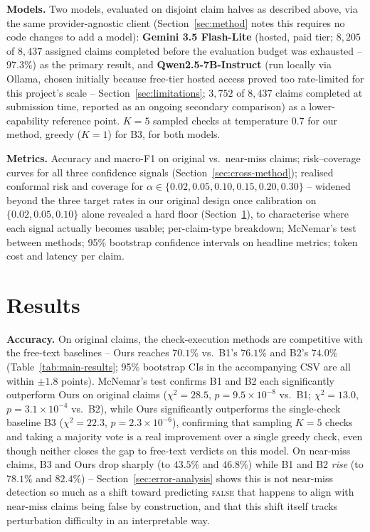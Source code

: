 \documentclass[journal]{IEEEtran}
\begin{document}
\textbf{Models.} Two models, evaluated on disjoint claim halves as described
above, via the same provider-agnostic client (Section~\ref{sec:method}
notes this requires no code changes to add a model): \textbf{Gemini 3.5
Flash-Lite} (hosted, paid tier; $8{,}205$ of $8{,}437$ assigned claims
completed before the evaluation budget was exhausted -- $97.3\%$) as the
primary result, and \textbf{Qwen2.5-7B-Instruct} (run locally via Ollama,
chosen initially because free-tier hosted access proved too rate-limited for
this project's scale -- Section~\ref{sec:limitations}; $3{,}752$ of $8{,}437$
claims completed at submission time, reported as an ongoing secondary
comparison) as a lower-capability reference point. $K=5$ sampled checks at
temperature $0.7$ for our method, greedy ($K=1$) for B3, for both models.

\textbf{Metrics.} Accuracy and macro-F1 on original vs.\ near-miss claims;
risk--coverage curves for all three confidence signals
(Section~\ref{sec:cross-method}); realised conformal risk and coverage for
$\alpha\in\{0.02,0.05,0.10,0.15,0.20,0.30\}$ -- widened beyond the three
target rates in our original design once calibration on $\{0.02,0.05,0.10\}$
alone revealed a hard floor (Section~\ref{sec:results}), to characterise
where each signal actually becomes usable; per-claim-type breakdown;
McNemar's test between methods; 95\% bootstrap confidence intervals on
headline metrics; token cost and latency per claim.

\section{Results}
\label{sec:results}



\textbf{Accuracy.} On original claims, the check-execution methods are
competitive with the free-text baselines -- Ours reaches $70.1\%$ vs.\
B1's $76.1\%$ and B2's $74.0\%$ (Table~\ref{tab:main-results}; 95\%
bootstrap CIs in the accompanying CSV are all within $\pm 1.8$ points).
McNemar's test confirms B1 and B2 each significantly outperform Ours on
original claims ($\chi^2=28.5$, $p=9.5\times10^{-8}$ vs.\ B1;
$\chi^2=13.0$, $p=3.1\times10^{-4}$ vs.\ B2), while Ours significantly
outperforms the single-check baseline B3 ($\chi^2=22.3$,
$p=2.3\times10^{-6}$), confirming that sampling $K=5$ checks and taking a
majority vote is a real improvement over a single greedy check, even though
neither closes the gap to free-text verdicts on this model. On near-miss
claims, B3 and Ours drop sharply (to $43.5\%$ and $46.8\%$) while B1 and B2
\emph{rise} (to $78.1\%$ and $82.4\%$) -- Section~\ref{sec:error-analysis}
shows this is not near-miss detection so much as a shift toward predicting
\textsc{false} that happens to align with near-miss claims being false by
construction, and that this shift itself tracks perturbation difficulty in
an interpretable way.
\end{document}
